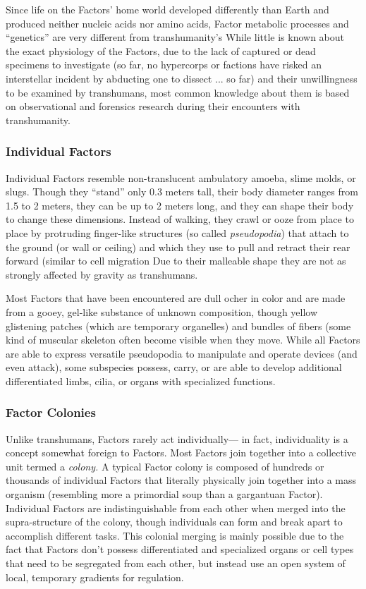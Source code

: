 Since life on the Factors' home world developed differently than Earth and produced neither nucleic acids nor amino acids, Factor metabolic processes and ``genetics'' are very different from transhumanity's While little is known about the exact physiology of the Factors, due to the lack of captured or dead specimens to investigate (so far, no hypercorps or factions have risked an interstellar incident by abducting one to dissect ... so far) and their unwillingness to be examined by transhumans, most common knowledge about them is based on observational and forensics research during their encounters with transhumanity. 

\subsubsection{Individual Factors} 

Individual Factors resemble non-translucent ambulatory amoeba, slime molds, or slugs. Though they ``stand'' only 0.3 meters tall, their body diameter ranges from 1.5 to 2 meters, they can be up to 2 meters long, and they can shape their body to change these dimensions. Instead of walking, they crawl or ooze from place to place by protruding finger-like structures (so called \textit{pseudopodia}) that attach to the ground (or wall or ceiling) and which they use to pull and retract their rear forward (similar to cell migration Due to their malleable shape they are not as strongly affected by gravity as transhumans. 

Most Factors that have been encountered are dull ocher in color and are made from a gooey, gel-like substance of unknown composition, though yellow glistening patches (which are temporary organelles) and bundles of fibers (some kind of muscular skeleton often become visible when they move. While all Factors are able to express versatile pseudopodia to manipulate and operate devices (and even attack), some subspecies possess, carry, or are able to develop additional differentiated limbs, cilia, or organs with specialized functions. 

\subsubsection{Factor Colonies} 

Unlike transhumans, Factors rarely act individually— in fact, individuality is a concept somewhat foreign to Factors. Most Factors join together into a collective unit termed a \textit{colony.} A typical Factor colony is composed of hundreds or thousands of individual Factors that literally physically join together into a mass organism (resembling more a primordial soup than a gargantuan Factor). Individual Factors are indistinguishable from each other when merged into the supra-structure of the colony, though individuals can form and break apart to accomplish different tasks. This colonial merging is mainly possible due to the fact that Factors don't possess differentiated and specialized organs or cell types that need to be segregated from each other, but instead use an open system of local, temporary gradients for regulation. 


